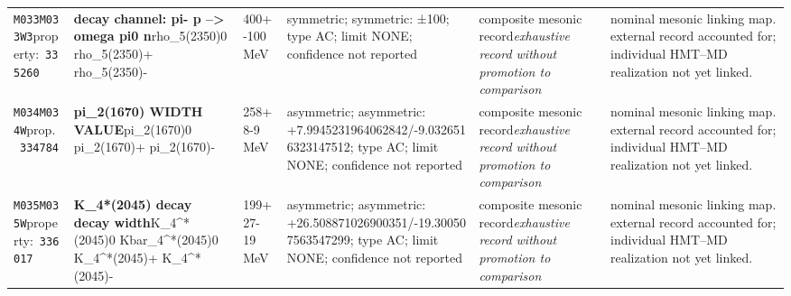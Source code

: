 \begin{landscape}
\begin{longtable}{L{1.85cm}L{4.45cm}L{2.35cm}L{4.05cm}L{3.35cm}L{7.15cm}}
\texttt{M033}\newline \texttt{M033W3}\newline property:\ \texttt{335260} & \textbf{decay channel: pi- p --\textgreater{} omega pi0 n}\newline rho\_\allowbreak{}5(2350)0 \textbar{}\allowbreak{} rho\_\allowbreak{}5(2350)+ \textbar{}\allowbreak{} rho\_\allowbreak{}5(2350)- & 400+-100\,MeV & symmetric; symmetric: ±100; type AC; limit NONE; confidence not reported & composite mesonic record\newline \emph{exhaustive record without promotion to comparison} & nominal mesonic linking map. external record accounted for; individual HMT--MD realization not yet linked. \\
\texttt{M034}\newline \texttt{M034W}\newline prop.\ \texttt{334784} & \textbf{pi\_\allowbreak{}2(1670) WIDTH VALUE}\newline pi\_\allowbreak{}2(1670)0 \textbar{}\allowbreak{} pi\_\allowbreak{}2(1670)+ \textbar{}\allowbreak{} pi\_\allowbreak{}2(1670)- & 258+8-9\,MeV & asymmetric; asymmetric: +7.9945231964062842/-9.0326516323147512; type AC; limit NONE; confidence not reported & composite mesonic record\newline \emph{exhaustive record without promotion to comparison} & nominal mesonic linking map. external record accounted for; individual HMT--MD realization not yet linked. \\
\texttt{M035}\newline \texttt{M035W}\newline property:\ \texttt{336017} & \textbf{K\_\allowbreak{}4*(2045) decay decay width}\newline K\_\allowbreak{}4\textasciicircum{}*(2045)0 \textbar{}\allowbreak{} Kbar\_\allowbreak{}4\textasciicircum{}*(2045)0 \textbar{}\allowbreak{} K\_\allowbreak{}4\textasciicircum{}*(2045)+ \textbar{}\allowbreak{} K\_\allowbreak{}4\textasciicircum{}*(2045)- & 199+27-19\,MeV & asymmetric; asymmetric: +26.508871026900351/-19.300507563547299; type AC; limit NONE; confidence not reported & composite mesonic record\newline \emph{exhaustive record without promotion to comparison} & nominal mesonic linking map. external record accounted for; individual HMT--MD realization not yet linked. \\

\end{longtable}
\end{landscape}
